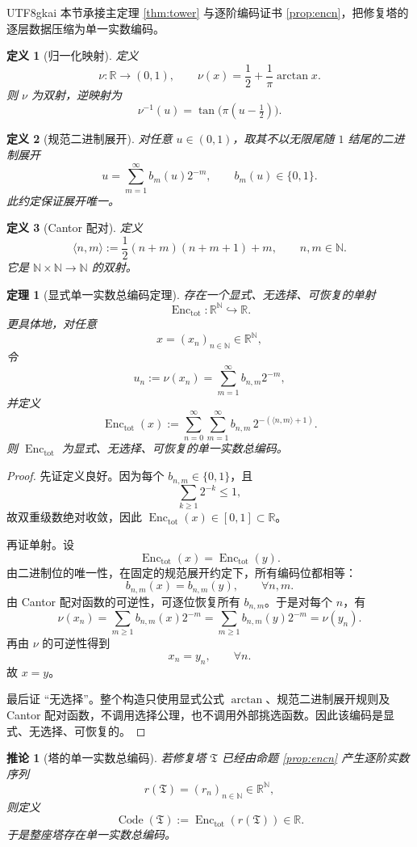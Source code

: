 \documentclass[12pt]{article}
\newtheorem{definition}{定义}[section]
\newtheorem{theorem}{定理}[section]
\newtheorem{corollary}{推论}[section]
\newcommand{\NN}{\mathbb{N}}
\newcommand{\RR}{\mathbb{R}}
\newcommand{\Enc}{\operatorname{Enc}}
\newcommand{\Code}{\operatorname{Code}}
\begin{document}
\begin{CJK*}{UTF8}{gkai}
本节承接主定理 \ref{thm:tower} 与逐阶编码证书 \ref{prop:encn}，把修复塔的逐层数据压缩为单一实数编码。

\begin{definition}[归一化映射]
定义
\[
\nu:\RR\to(0,1),\qquad
\nu(x)=\frac12+\frac{1}{\pi}\arctan x.
\]
则 $\nu$ 为双射，逆映射为
\[
\nu^{-1}(u)=\tan\bigl(\pi(u-\tfrac12)\bigr).
\]
\end{definition}

\begin{definition}[规范二进制展开]
对任意 $u\in(0,1)$，取其不以无限尾随 $1$ 结尾的二进制展开
\[
u=
\sum_{m=1}^{\infty} b_m(u)2^{-m},
\qquad
b_m(u)\in\{0,1\}.
\]
此约定保证展开唯一。
\end{definition}

\begin{definition}[Cantor 配对]
定义
\[
\langle n,m\rangle:=\frac12(n+m)(n+m+1)+m,
\qquad n,m\in\NN.
\]
它是 $\NN\times\NN\to\NN$ 的双射。
\end{definition}

\begin{theorem}[显式单一实数总编码定理]\label{thm:realcode}
存在一个显式、无选择、可恢复的单射
\[
\Enc_{\mathrm{tot}}:\RR^\NN\hookrightarrow \RR.
\]
更具体地，对任意
\[
x=(x_n)_{n\in\NN}\in\RR^\NN,
\]
令
\[
u_n:=\nu(x_n)=\sum_{m=1}^{\infty}b_{n,m}2^{-m},
\]
并定义
\[
\Enc_{\mathrm{tot}}(x):=
\sum_{n=0}^{\infty}\sum_{m=1}^{\infty}
 b_{n,m}\,2^{-(\langle n,m\rangle+1)}.
\]
则 $\Enc_{\mathrm{tot}}$ 为显式、无选择、可恢复的单一实数总编码。
\end{theorem}

\begin{proof}
先证定义良好。因为每个 $b_{n,m}\in\{0,1\}$，且
\[
\sum_{k\ge 1}2^{-k}\le 1,
\]
故双重级数绝对收敛，因此 $\Enc_{\mathrm{tot}}(x)\in[0,1]\subset \RR$。

再证单射。设
\[
\Enc_{\mathrm{tot}}(x)=\Enc_{\mathrm{tot}}(y).
\]
由二进制位的唯一性，在固定的规范展开约定下，所有编码位都相等：
\[
b_{n,m}(x)=b_{n,m}(y),\qquad \forall n,m.
\]
由 Cantor 配对函数的可逆性，可逐位恢复所有 $b_{n,m}$。于是对每个 $n$，有
\[
\nu(x_n)=\sum_{m\ge 1}b_{n,m}(x)2^{-m}=
\sum_{m\ge 1}b_{n,m}(y)2^{-m}=\nu(y_n).
\]
再由 $\nu$ 的可逆性得到
\[
x_n=y_n,\qquad \forall n.
\]
故 $x=y$。

最后证 ``无选择''。整个构造只使用显式公式 $\arctan$、规范二进制展开规则及 Cantor 配对函数，不调用选择公理，也不调用外部挑选函数。因此该编码是显式、无选择、可恢复的。
\end{proof}

\begin{corollary}[塔的单一实数总编码]\label{cor:towercode}
若修复塔 $\mathfrak T$ 已经由命题 \ref{prop:encn} 产生逐阶实数序列
\[
r(\mathfrak T)=(r_n)_{n\in\NN}\in\RR^\NN,
\]
则定义
\[
\Code(\mathfrak T):=\Enc_{\mathrm{tot}}(r(\mathfrak T))\in\RR.
\]
于是整座塔存在单一实数总编码。
\end{corollary}


\end{CJK*}
\end{document}

